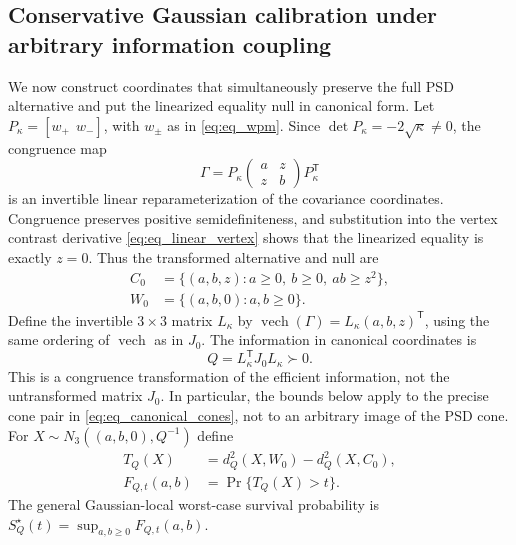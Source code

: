 \subsection{Conservative Gaussian calibration under arbitrary information coupling}
\label{subsec:eq_calibration}
We now construct coordinates that simultaneously preserve the full
PSD alternative and put the linearized equality null in canonical form.
Let $P_\kappa=[w_+\ \ w_-]$, with $w_\pm$ as in
\eqref{eq:eq_wpm}. Since $\det P_\kappa=-2\sqrt\kappa\ne0$,
the congruence map
\begin{equation}\label{eq:eq_canonical_map}
 \Gamma=P_\kappa
 \begin{pmatrix}a&z\\z&b\end{pmatrix}P_\kappa^{\mathsf T}
\end{equation}
is an invertible linear reparameterization of the covariance
coordinates. Congruence preserves positive semidefiniteness, and
substitution into the vertex contrast derivative
\eqref{eq:eq_linear_vertex} shows that the linearized equality is
exactly $z=0$. Thus the transformed alternative and null are
\begin{equation}\label{eq:eq_canonical_cones}
 \begin{aligned}
 C_0&=\{(a,b,z):a\ge0,\ b\ge0,\ ab\ge z^2\},\\
 W_0&=\{(a,b,0):a,b\ge0\}.
 \end{aligned}
\end{equation}
Define the invertible $3\times3$ matrix $L_\kappa$ by
$\operatorname{vech}(\Gamma)=L_\kappa(a,b,z)^{\mathsf T}$,
using the same ordering of $\operatorname{vech}$ as in $J_0$.
The information in canonical coordinates is
\begin{equation}\label{eq:eq_canonical_Q}
 Q=L_\kappa^{\mathsf T}J_0L_\kappa\succ0.
\end{equation}
This is a congruence transformation of the efficient information,
not the untransformed matrix $J_0$. In particular, the bounds below
apply to the precise cone pair in \eqref{eq:eq_canonical_cones},
not to an arbitrary image of the PSD cone.
For $X\sim N_3((a,b,0),Q^{-1})$ define
\begin{equation}\label{eq:eq_Qstat}
 \begin{aligned}
 T_Q(X)&=d_Q^2(X,W_0)-d_Q^2(X,C_0),\\
 F_{Q,t}(a,b)&=\Pr\{T_Q(X)>t\}.
 \end{aligned}
\end{equation}
The general Gaussian-local worst-case survival probability is
$S_Q^\star(t)=\sup_{a,b\geq0}F_{Q,t}(a,b)$.


